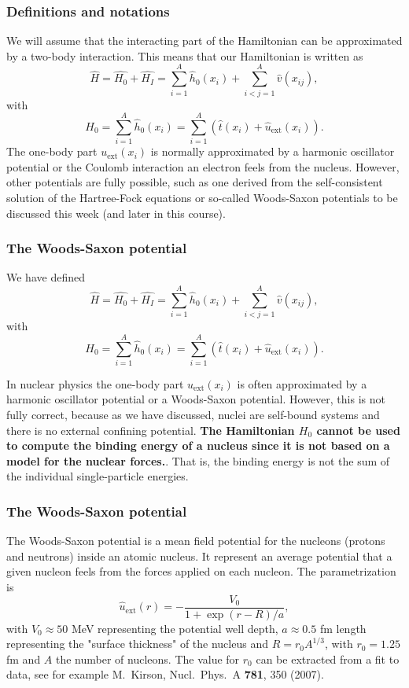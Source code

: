 \documentclass[compress]{beamer}
\begin{document}
\frame
{
  \frametitle{Definitions and notations}
\begin{small}
{\scriptsize
We will assume that the interacting part of the Hamiltonian
can be approximated by a two-body interaction.
This means that our Hamiltonian is written as 
\begin{equation}
    \hat{H} = \hat{H_0} + \hat{H_I} 
    = \sum_{i=1}^A \hat{h}_0(x_i) + \sum_{i<j=1}^A \hat{v}(x_{ij}),
\label{Hnuclei}
\end{equation}
with 
\begin{equation}
  H_0=\sum_{i=1}^A \hat{h}_0(x_i) =  \sum_{i=1}^A\left(\hat{t}(x_i) + \hat{u}_{\mathrm{ext}}(x_i)\right).
\label{hinuclei}
\end{equation}
The one-body part $u_{\mathrm{ext}}(x_i)$ is normally approximated by a harmonic oscillator potential or the Coulomb interaction an electron feels from the nucleus. However, other potentials are fully possible, such as 
one derived from the self-consistent solution of the Hartree-Fock equations or so-called Woods-Saxon potentials to be discussed this week (and later in this course).
}
\end{small}
}

\frame
{
  \frametitle{The Woods-Saxon potential}
\begin{small}
{\scriptsize
We have defined
\[
    \hat{H} = \hat{H_0} + \hat{H_I} 
    = \sum_{i=1}^A \hat{h}_0(x_i) + \sum_{i<j=1}^A \hat{v}(x_{ij}),
\]
with 
\[
  H_0=\sum_{i=1}^A \hat{h}_0(x_i) =  \sum_{i=1}^A\left(\hat{t}(x_i) + \hat{u}_{\mathrm{ext}}(x_i)\right).
\]

In nuclear physics the one-body part $u_{\mathrm{ext}}(x_i)$ is often approximated by a harmonic oscillator potential or a
Woods-Saxon potential. However, this is not fully correct, because as we have discussed, nuclei are self-bound systems and there is no external confining potential. {\bf The Hamiltonian $H_0$ cannot be used to compute the binding energy of a nucleus since it is not based on a model for the nuclear forces.}. That is, the binding energy is not the sum of the individual single-particle energies. 
}
\end{small}
}


\frame
{
  \frametitle{The Woods-Saxon potential}
\begin{small}
{\scriptsize
The Woods-Saxon potential is a mean field potential for the nucleons (protons and neutrons) 
inside an atomic nucleus. It represent an average potential that a given nucleon feels from  the forces applied on each nucleon. 
The parametrization is
\[
\hat{u}_{\mathrm{ext}}(r)=-\frac{V_0}{1+\exp{(r-R)/a}},
\]
with $V_0\approx 50$ MeV representing the potential well depth, $a\approx 0.5$ fm 
length representing the "surface thickness" of the nucleus and $R=r_0A^{1/3}$, with $r_0=1.25$ fm and $A$ the number of nucleons.
The value for $r_0$ can be extracted from a fit to data, see for example M.~Kirson, Nucl.~Phys.~A {\bf 781}, 350 (2007).
}
\end{small}
}
\end{document}

